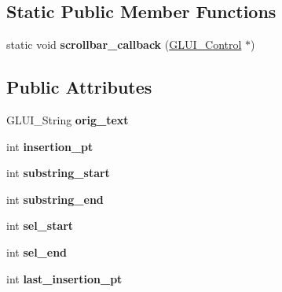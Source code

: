 \subsection*{Static Public Member Functions}
\begin{DoxyCompactItemize}
\item 
\hypertarget{classGLUI__TextBox_a404d9344bf6af8855d379d006001a3a4}{static void {\bfseries scrollbar\-\_\-callback} (\hyperlink{classGLUI__Control}{G\-L\-U\-I\-\_\-\-Control} $\ast$)}\label{classGLUI__TextBox_a404d9344bf6af8855d379d006001a3a4}

\end{DoxyCompactItemize}
\subsection*{Public Attributes}
\begin{DoxyCompactItemize}
\item 
\hypertarget{classGLUI__TextBox_acedd73b9f1446f4fb4609b775de4dcf9}{G\-L\-U\-I\-\_\-\-String {\bfseries orig\-\_\-text}}\label{classGLUI__TextBox_acedd73b9f1446f4fb4609b775de4dcf9}

\item 
\hypertarget{classGLUI__TextBox_a2341b0e1fd1578c70670776a48b70203}{int {\bfseries insertion\-\_\-pt}}\label{classGLUI__TextBox_a2341b0e1fd1578c70670776a48b70203}

\item 
\hypertarget{classGLUI__TextBox_a3607ee96b4b08fdbe40f2ae9f7b7e329}{int {\bfseries substring\-\_\-start}}\label{classGLUI__TextBox_a3607ee96b4b08fdbe40f2ae9f7b7e329}

\item 
\hypertarget{classGLUI__TextBox_a71b4b00d8f8256c2c019286be1630198}{int {\bfseries substring\-\_\-end}}\label{classGLUI__TextBox_a71b4b00d8f8256c2c019286be1630198}

\item 
\hypertarget{classGLUI__TextBox_ae3ec04f839ed154f00d8a8acefcd4400}{int {\bfseries sel\-\_\-start}}\label{classGLUI__TextBox_ae3ec04f839ed154f00d8a8acefcd4400}

\item 
\hypertarget{classGLUI__TextBox_ae5169ff2c5d0d884614d8971b08339c5}{int {\bfseries sel\-\_\-end}}\label{classGLUI__TextBox_ae5169ff2c5d0d884614d8971b08339c5}

\item 
\hypertarget{classGLUI__TextBox_ae2cf6781e36f9d0fd01ac5c8f9607679}{int {\bfseries last\-\_\-insertion\-\_\-pt}}\label{classGLUI__TextBox_ae2cf6781e36f9d0fd01ac5c8f9607679}


\end{DoxyCompactItemize}
